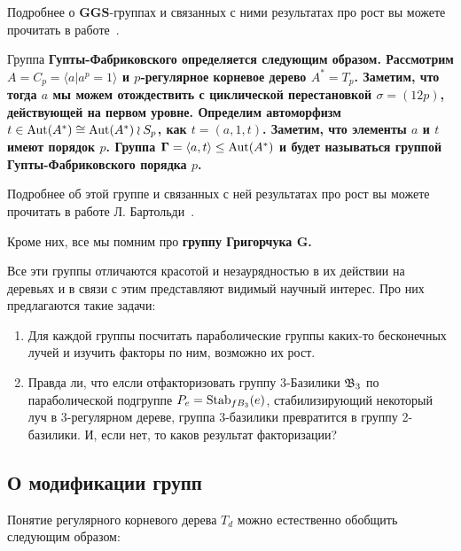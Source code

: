 \documentclass[12pt, oneside, dvipsnames]{extarticle}
\begin{document}
	Подробнее о $\mathbf{GGS}$-группах и связанных с ними результатах про рост вы можете прочитать в работе~\cite{didomenico2022ggsgroups}. 

	\begin{definition} 
		Группа \bf{Гупты-Фабриковского} определяется следующим образом. Рассмотрим $A = C_{p} = \langle a \vert a^p = 1 \rangle $  и $p$-регулярное корневое дерево $A^* = T_p$.  Заметим, что тогда $a$ мы можем отождествить с циклической перестановкой $\sigma = (1 2 p)$, действующей на первом уровне. Определим автоморфизм $t \in \operatorname{Aut}(A^*) \cong \operatorname{Aut}(A^*) \wr S_{p} $, как $t = (a, 1, t)$. Заметим, что элементы $a$ и $t$ имеют порядок $p$. Группа $\mathbf{\Gamma} = \langle a, t \rangle \le \operatorname{Aut}(A^*)$ и будет называться группой \bf{Гупты-Фабриковского} порядка $p$. 
	\end{definition}

	Подробнее об этой группе и связанных с ней результатах про рост вы можете прочитать в работе Л. Бартольди~\cite{Bartholdi_2009}. 

	Кроме них, все мы помним про \bf{группу Григорчука $\mathbf{G}$}. 

	Все эти группы отличаются красотой и незаурядностью в их действии на деревьях и в связи с этим представляют видимый научный интерес. Про них предлагаются такие задачи: 

	\begin{enumerate}
		\item Для каждой группы посчитать параболические группы каких-то бесконечных лучей и изучить факторы по ним, возможно их рост.

		\item Правда ли, что елсли отфакторизовать группу 3-Базилики $\mathfrak{B}_{3}$ по параболической подгруппе $P_{e} = \operatorname{Stab}_{fB_{3}}(e)$, стабилизирующий некоторый луч в 3-регулярном дереве, группа $3$-базилики превратится в группу 2-базилики. И, если нет, то каков результат факторизации? 
	\end{enumerate}




	\begin{center}
		\subsection*{О модификации групп}
	\end{center}

	Понятие регулярного корневого дерева $T_{d}$ можно естественно обобщить следующим образом: 
\end{document}

